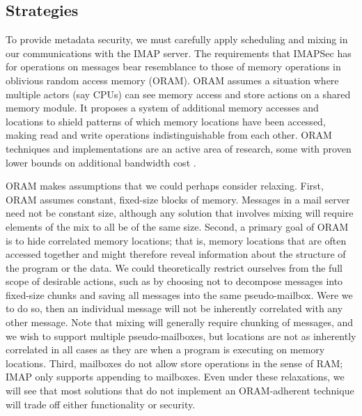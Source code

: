 \documentclass[pageno]{jpaper}
\newcommand{\project}{IMAPSec }
\begin{document}
\subsection{Strategies}
\label{best-metadata}

To provide metadata security, we must carefully apply scheduling and mixing in our communications with the IMAP server. The requirements that \project has for operations on messages bear resemblance to those of memory operations in oblivious random access memory (ORAM)\cite{oram}. ORAM assumes a situation where multiple actors (say CPUs) can see memory access and store actions on a shared memory module. It proposes a system of additional memory accesses and locations to shield patterns of which memory locations have been accessed, making read and write operations indistinguishable from each other. ORAM techniques and implementations are an active area of research, some with proven lower bounds on additional bandwidth cost \cite{stefanov2013path}.

ORAM makes assumptions that we could perhaps consider relaxing. First, ORAM assumes constant, fixed-size blocks of memory. Messages in a mail server need not be constant size, although any solution that involves mixing will require elements of the mix to all be of the same size. Second, a primary goal of ORAM is to hide correlated memory locations; that is, memory locations that are often accessed together and might therefore reveal information about the structure of the program or the data. We could theoretically restrict ourselves from the full scope of desirable actions, such as by choosing not to decompose messages into fixed-size chunks and saving all messages into the same pseudo-mailbox. Were we to do so, then an individual message will not be inherently correlated with any other message. Note that mixing will generally require chunking of messages, and we wish to support multiple pseudo-mailboxes, but locations are not as inherently correlated in all cases as they are when a program is executing on memory locations. Third, mailboxes do not allow store operations in the sense of RAM; IMAP only supports appending to mailboxes. Even under these relaxations, we will see that most solutions that do not implement an ORAM-adherent technique will trade off either functionality or security.
\end{document}
